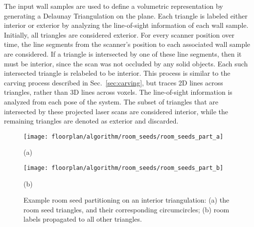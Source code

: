 \documentclass[10pt,twocolumn,twoside]{IEEEtran}
\begin{document}
The input wall samples are used to define a volumetric representation by generating a Delaunay Triangulation on the plane.  Each triangle is labeled either interior or exterior by analyzing the line-of-sight information of each wall sample.  Initially, all triangles are considered exterior.  For every scanner position over time, the line segments from the scanner's position to each associated wall sample are considered.  If a triangle is intersected by one of these line segments, then it must be interior, since the scan was not occluded by any solid objects.  Each such intersected triangle is relabeled to be interior.  This process is similar to the carving process described in Sec.~\ref{sec:carving}, but traces 2D lines across triangles, rather than 3D lines across voxels.  The line-of-sight information is analyzed from each pose of the system.  The subset of triangles that are intersected by these projected laser scans are considered interior, while the remaining triangles are denoted as exterior and discarded.


\begin{figure}[t]
  \centering
	\begin{minipage}[t]{0.9\linewidth}
		\centering
  		\texttt{[image: floorplan/algorithm/room\_seeds/room\_seeds\_part\_a]}
		\centerline{(a)}\medskip
  	\end{minipage}
	\begin{minipage}[t]{0.9\linewidth}
		\centering
  		\texttt{[image: floorplan/algorithm/room\_seeds/room\_seeds\_part\_b]}
		\centerline{(b)}\medskip
  	\end{minipage}
  \caption{Example room seed partitioning on an interior triangulation: (a) the room seed triangles, and their corresponding circumcircles; (b) room labels propagated to all other triangles.}
  \label{fig:roomlabeling}
\end{figure}
\end{document}
